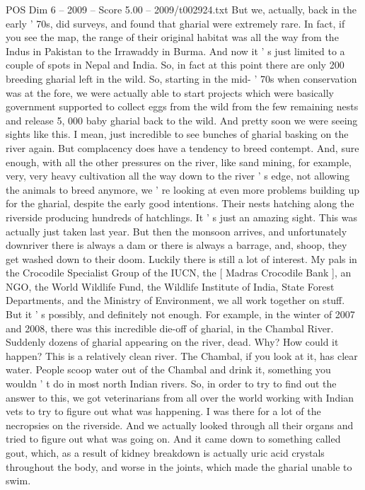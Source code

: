 \begin{textsample}{POS Dim 6 – 2009 – Score 5.00 – 2009/t002924.txt}
But we, actually, back in the early ' 70s, did surveys, and found that gharial were extremely rare.
In fact, if you see the map, the range of their original habitat was all the way from the Indus in Pakistan to the Irrawaddy in Burma.
And now it ' s just limited to a couple of spots in Nepal and India.
So, in fact at this point there are only 200 breeding gharial left in the wild.
So, starting in the mid- ' 70s when conservation was at the fore, we were actually able to start projects which were basically government supported to collect eggs from the wild from the few remaining nests and release 5, 000 baby gharial back to the wild.
And pretty soon we were seeing sights like this.
I mean, just incredible to see bunches of gharial basking on the river again.
But complacency does have a tendency to breed contempt.
And, sure enough, with all the other pressures on the river, like sand mining, for example, very, very heavy cultivation all the way down to the river ' s edge, not allowing the animals to breed anymore, we ' re looking at even more problems building up for the gharial, despite the early good intentions.
Their nests hatching along the riverside producing hundreds of hatchlings.
It ' s just an amazing sight.
This was actually just taken last year.
But then the monsoon arrives, and unfortunately downriver there is always a dam or there is always a barrage, and, shoop, they get washed down to their doom.
Luckily there is still a lot of interest.
My pals in the Crocodile Specialist Group of the IUCN, the [ Madras Crocodile Bank ], an NGO, the World Wildlife Fund, the Wildlife Institute of India, State Forest Departments, and the Ministry of Environment, we all work together on stuff.
But it ' s possibly, and definitely not enough.
For example, in the winter of 2007 and 2008, there was this incredible die-off of gharial, in the Chambal River.
Suddenly dozens of gharial appearing on the river, dead.
Why?
How could it happen?
This is a relatively clean river.
The Chambal, if you look at it, has clear water.
People scoop water out of the Chambal and drink it, something you wouldn ' t do in most north Indian rivers.
So, in order to try to find out the answer to this, we got veterinarians from all over the world working with Indian vets to try to figure out what was happening.
I was there for a lot of the necropsies on the riverside.
And we actually looked through all their organs and tried to figure out what was going on.
And it came down to something called gout, which, as a result of kidney breakdown is actually uric acid crystals throughout the body, and worse in the joints, which made the gharial unable to swim.

\end{textsample}
